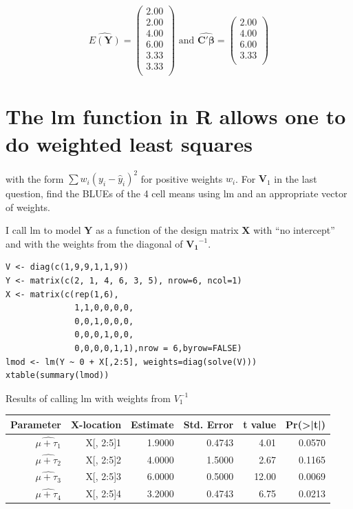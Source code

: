 \documentclass[11pt]{article}
\begin{document}
\[
\widehat{E(\mathbf{Y})} =
\begin{pmatrix}{}
  2.00 \\ 
  2.00 \\ 
  4.00 \\ 
  6.00 \\ 
  3.33 \\ 
  3.33 \\ 
  \end{pmatrix}\,\,\mathrm{and}\,\,\widehat{\mathbf{C'\beta}} =
\begin{pmatrix}{}
  2.00 \\ 
  4.00 \\ 
  6.00 \\ 
  3.33 \\ 
  \end{pmatrix}
\]
\section{The lm function in R allows one to do weighted least squares}
\label{sec-3}

 with the form $\sum w_i(y_i-\hat{y}_i)^2$ for positive weights $w_i$.
 For $\mathbf{V}_1$ in the last question, find the BLUEs of the 4 cell
 means using lm and an appropriate vector of weights.


I call lm to model $\mathbf{Y}$ as a function of the design matrix $\mathbf{X}$ with
``no intercept'' and with the weights from the diagonal of $\mathbf{V_1}^{-1}$.


\begin{verbatim}
V <- diag(c(1,9,9,1,1,9))
Y <- matrix(c(2, 1, 4, 6, 3, 5), nrow=6, ncol=1)
X <- matrix(c(rep(1,6),
              1,1,0,0,0,0,
              0,0,1,0,0,0,
              0,0,0,1,0,0,
              0,0,0,0,1,1),nrow = 6,byrow=FALSE)
lmod <- lm(Y ~ 0 + X[,2:5], weights=diag(solve(V)))
xtable(summary(lmod))
\end{verbatim}

\begin{table}[ht]
\centering
Results of calling lm with weights from $V_1^{-1}$\\
\begin{tabular}{rrrrrr}
  \hline
 Parameter & X-location & Estimate & Std. Error & t value & Pr(>|t|) \\ 
  \hline
$\widehat{\mu + \tau_1}$ & X[, 2:5]1 & 1.9000 & 0.4743 & 4.01 & 0.0570 \\ 
$\widehat{\mu + \tau_2}$ &  X[, 2:5]2 & 4.0000 & 1.5000 & 2.67 & 0.1165 \\ 
$\widehat{\mu + \tau_3}$ &  X[, 2:5]3 & 6.0000 & 0.5000 & 12.00 & 0.0069 \\ 
$\widehat{\mu + \tau_4}$ &  X[, 2:5]4 & 3.2000 & 0.4743 & 6.75 & 0.0213 \\ 
   \hline
\end{tabular}
\end{table}
\end{document}
